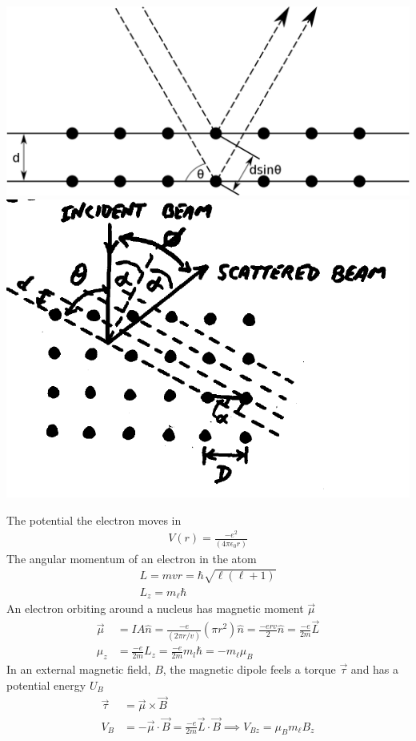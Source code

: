 \begin{center}
	\includegraphics[scale=0.2]{./Images/Diagrams/1280px-BraggPlaneDiffraction.png} \includegraphics[scale=0.25]{./Images/Diagrams/crystalscattering.png}
\end{center}





The potential the electron moves in
\begin{align}
V(r)=\frac{-e^2}{(4\pi \epsilon_0r)}
\end{align}
The angular momentum of an electron in the atom
\begin{align}
L=mvr=\hbar\sqrt{\ell(\ell+1)} \\
L_z=m_\ell\hbar 
\end{align}
An electron orbiting around a nucleus has magnetic moment $\vec{\mu}$
\begin{align}
\vec{\mu}&=IA\hat{n}=\frac{-e}{(2\pi r/v)}(\pi r^2)\hat{n}=\frac{-erv}{2}\hat{n}=\frac{-e}{2m}\vec{L} \\
\mu_z&=\frac{-e}{2m}L_z=\frac{-e}{2m}m_l\hbar=-m_\ell\mu_B 
\end{align}
In an external magnetic field, $B$, the
magnetic dipole feels a torque $\vec{\tau}$ and has a potential energy $U_B$
\begin{align}
\vec{\tau}&=\vec{\mu}\times \vec{B} \\
V_B&=-\vec{\mu}\cdot \vec{B} = \frac{-e}{2m}\vec{L} \cdot \vec{B} \implies V_{Bz}= \mu_B m_\ell B_z
\end{align}
